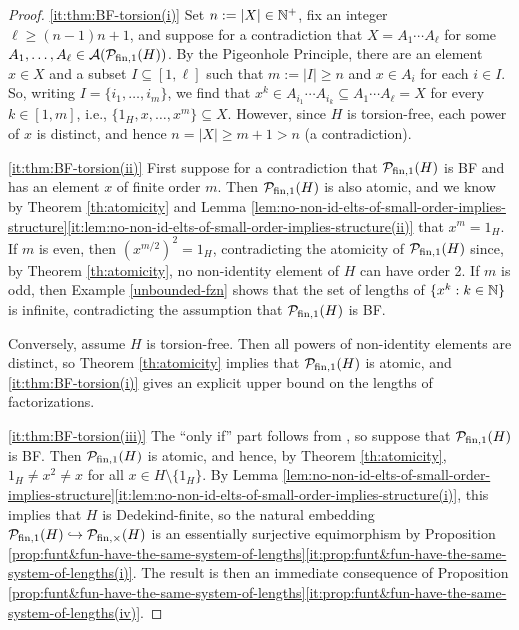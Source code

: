 \begin{proof}
	\ref{it:thm:BF-torsion(i)}
	Set $n := |X| \in \mathbb{N}^+$, fix an integer $\ell \ge (n-1)n + 1$, and suppose for a contradiction that $X = A_1\cdots A_\ell$ for some $A_1,\dots, A_\ell\in \mathcal{A}(\mathcal{P}_{\textrm{fin}, 1}(H))$.
	By the Pigeonhole Principle, there are an element $x\in X$ and a subset $I \subseteq [ 1,\ell ]$ such that $m := |I| \ge n$ and $x \in A_i$ for each $i\in I$.
	So, writing $I = \{i_1,\ldots, i_m\}$, we find that $x^k \in A_{i_1} \cdots A_{i_k} \subseteq A_1\cdots A_\ell = X$ for every $k \in [ 1, m ]$, i.e., $\{1_H,x,\dots, x^m\} \subseteq X$.
	However, since $H$ is torsion-free, each power of $x$ is distinct, and hence $n = |X| \ge m+1 > n$ (a contradiction).
	
	\ref{it:thm:BF-torsion(ii)}
	First suppose for a contradiction that $\mathcal{P}_{\textrm{fin}, 1}(H)$ is BF and has an element $x$ of finite order $m$. Then $\mathcal{P}_{\textrm{fin}, 1}(H)$ is also atomic, and we know by Theorem \ref{th:atomicity} and Lemma \ref{lem:no-non-id-elts-of-small-order-implies-structure}\ref{it:lem:no-non-id-elts-of-small-order-implies-structure(ii)} that $x^m = 1_H$.
	If $m$ is even, then $(x^{m/2})^2 = 1_H$, contradicting the atomicity of $\mathcal{P}_{\textrm{fin}, 1}(H)$ since, by Theorem \ref{th:atomicity}, no non-identity element of $H$ can have order 2. 
	If $m$ is odd, then Example \ref{unbounded-fzn} shows that the set of lengths of $\{x^k : k \in \mathbb{N} \}$ is infinite, contradicting the assumption that $\mathcal{P}_{\textrm{fin}, 1}(H)$ is BF.
	
	Conversely, assume $H$ is torsion-free. Then all powers of non-identity elements are distinct, so Theorem \ref{th:atomicity} implies that $\mathcal{P}_{\textrm{fin}, 1}(H)$ is atomic, and \ref{it:thm:BF-torsion(i)} gives an explicit upper bound on the lengths of factorizations.
	
	\ref{it:thm:BF-torsion(iii)} 
	The ``only if'' part follows from \cite[Theorem 2.28(iv) and Corollary 2.29]{fan-tringali18}, so suppose that $\mathcal{P}_{\textrm{fin}, 1}(H)$ is BF.
	Then $\mathcal{P}_{\textrm{fin}, 1}(H)$ is atomic, and hence, by Theorem \ref{th:atomicity}, $1_H \neq x^2 \neq x$ for all $x\in H\setminus\{1_H\}$.
	By Lemma \ref{lem:no-non-id-elts-of-small-order-implies-structure}\ref{it:lem:no-non-id-elts-of-small-order-implies-structure(i)}, this implies that $H$ is Dedekind-finite, so the natural embedding $\mathcal{P}_{\textrm{fin}, 1}(H)\hookrightarrow\mathcal{P}_{\textrm{fin}, \times}(H)$ is an essentially surjective equimorphism by Proposition \ref{prop:funt&fun-have-the-same-system-of-lengths}\ref{it:prop:funt&fun-have-the-same-system-of-lengths(i)}.
	The result is then an immediate consequence of Proposition  \ref{prop:funt&fun-have-the-same-system-of-lengths}\ref{it:prop:funt&fun-have-the-same-system-of-lengths(iv)}.
\end{proof}


